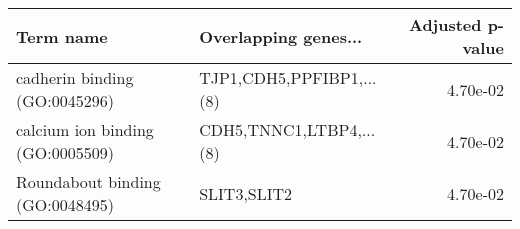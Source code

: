 \begin{tabular}{llr}
\toprule
                       Term name &     Overlapping genes... &  Adjusted p-value \\
\midrule
   cadherin binding (GO:0045296) & TJP1,CDH5,PPFIBP1,...(8) &          4.70e-02 \\
calcium ion binding (GO:0005509) &  CDH5,TNNC1,LTBP4,...(8) &          4.70e-02 \\
 Roundabout binding (GO:0048495) &              SLIT3,SLIT2 &          4.70e-02 \\
\bottomrule
\end{tabular}
